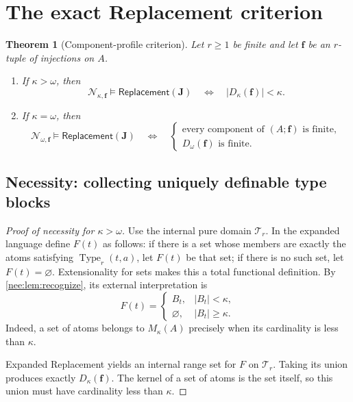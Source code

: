 \documentclass[11pt,letterpaper]{article}
\numberwithin{equation}{section}
\theoremstyle{plain}
\newtheorem{theorem}{Theorem}[section]
\theoremstyle{definition}
\theoremstyle{remark}
\newcommand{\Rep}{\mathsf{Replacement}}
\begin{document}
\section{The exact Replacement criterion}\label{nee:sec:replacement}

\begin{theorem}[Component-profile criterion]\label{nee:thm:profile}
Let $r\geq1$ be finite and let $\boldsymbol f$ be an $r$-tuple of injections on $A$.
\begin{enumerate}
\item If $\kappa>\omega$, then
\begin{equation}\label{nee:eq:profileunc}
\mathcal N_{\kappa,\boldsymbol f}\models\Rep(\boldsymbol J)
\quad\Longleftrightarrow\quad
|D_\kappa(\boldsymbol f)|<\kappa.
\end{equation}
\item If $\kappa=\omega$, then
\begin{equation}\label{nee:eq:profilefin}
\mathcal N_{\omega,\boldsymbol f}\models\Rep(\boldsymbol J)
\quad\Longleftrightarrow\quad
\begin{cases}
\text{every component of }(A;\boldsymbol f)\text{ is finite},\\
D_\omega(\boldsymbol f)\text{ is finite}.
\end{cases}
\end{equation}
\end{enumerate}
\end{theorem}

\subsection{Necessity: collecting uniquely definable type blocks}
\begin{proof}[Proof of necessity for $\kappa>\omega$]
Use the internal pure domain $\mathcal T_r$. In the expanded language define $F(t)$ as follows: if there is a set whose members are exactly the atoms satisfying $\operatorname{Type}_r(t,a)$, let $F(t)$ be that set; if there is no such set, let $F(t)=\varnothing$. Extensionality for sets makes this a total functional definition. By \cref{nee:lem:recognize}, its external interpretation is
\[
F(t)=
\begin{cases}
B_t,&|B_t|<\kappa,\\
\varnothing,&|B_t|\geq\kappa.
\end{cases}
\]
Indeed, a set of atoms belongs to $M_\kappa(A)$ precisely when its cardinality is less than $\kappa$.

Expanded Replacement yields an internal range set for $F$ on $\mathcal T_r$. Taking its union produces exactly $D_\kappa(\boldsymbol f)$. The kernel of a set of atoms is the set itself, so this union must have cardinality less than $\kappa$.
\end{proof}
\end{document}
